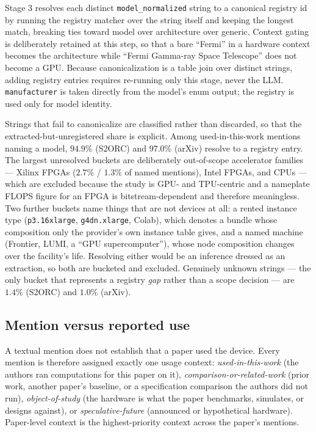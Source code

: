 Stage 3 resolves each distinct \texttt{model\_normalized} string to a canonical
registry id by running the registry matcher over the string itself and keeping
the longest match, breaking ties toward model over architecture over generic.
Context gating is deliberately retained at this step, so that a bare
``Fermi'' in a hardware context becomes the architecture while ``Fermi
Gamma-ray Space Telescope'' does not become a GPU. Because canonicalization is
a table join over distinct strings, adding registry entries requires re-running
only this stage, never the LLM. \texttt{manufacturer} is taken directly from the
model's enum output; the registry is used only for model identity.

Strings that fail to canonicalize are classified rather than discarded, so that
the extracted-but-unregistered share is explicit. Among used-in-this-work
mentions naming a model, $94.9\%$ (S2ORC) and $97.0\%$ (arXiv) resolve to a
registry entry. %
The largest unresolved buckets are deliberately out-of-scope
accelerator families --- Xilinx FPGAs ($2.7\%$ / $1.3\%$ of named mentions),
Intel FPGAs, and CPUs --- which are excluded because the study is GPU- and
TPU-centric and a nameplate FLOPS figure for an FPGA is bitstream-dependent and
therefore meaningless. Two further buckets name things that are not devices at
all: a rented instance type (\texttt{p3.16xlarge}, \texttt{g4dn.xlarge}, Colab),
which denotes a bundle whose composition only the provider's own instance table
gives, and a named machine (Frontier, LUMI, a ``GPU supercomputer''), whose node
composition changes over the facility's life. Resolving either would be an
inference dressed as an extraction, so both are bucketed and excluded.
Genuinely unknown strings --- the only bucket that represents a registry
\emph{gap} rather than a scope decision --- are $1.4\%$ (S2ORC) and
$1.0\%$ (arXiv).

\subsection{Mention versus reported use}

A textual mention does not establish that a paper used the device. Every mention
is therefore assigned exactly one usage context: \emph{used-in-this-work} (the
authors ran computations for this paper on it), \emph{comparison-or-related-work}
(prior work, another paper's baseline, or a specification comparison the authors
did not run), \emph{object-of-study} (the hardware is what the paper
benchmarks, simulates, or designs against), or \emph{speculative-future}
(announced or hypothetical hardware). Paper-level context is the
highest-priority context across the paper's mentions.

